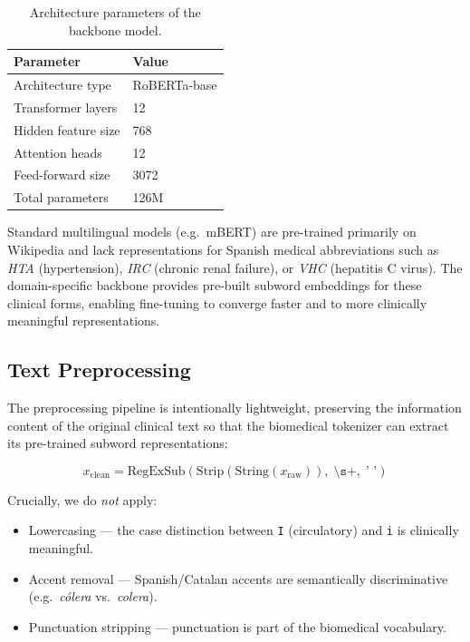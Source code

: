 \documentclass[10pt,a4paper,twocolumn]{article}
\begin{document}
\begin{table}[H]
\centering
\caption{Architecture parameters of the backbone model.}
\label{tab:backbone}
\begin{tabular}{ll}
\toprule
\textbf{Parameter} & \textbf{Value} \\
\midrule
Architecture type    & RoBERTa-base \\
Transformer layers   & 12 \\
Hidden feature size  & 768 \\
Attention heads      & 12 \\
Feed-forward size    & 3072 \\
Total parameters     & 126M \\
\bottomrule
\end{tabular}
\end{table}

Standard multilingual models (e.g.\ mBERT) are pre-trained primarily on Wikipedia
and lack representations for Spanish medical abbreviations such as \textit{HTA}
(hypertension), \textit{IRC} (chronic renal failure), or \textit{VHC} (hepatitis
C virus). The domain-specific backbone provides pre-built subword embeddings for
these clinical forms, enabling fine-tuning to converge faster and to more
clinically meaningful representations.

\subsection{Text Preprocessing}

The preprocessing pipeline is intentionally lightweight, preserving the
information content of the original clinical text so that the biomedical
tokenizer can extract its pre-trained subword representations:

\begin{equation}
  x_{\text{clean}} = \mathrm{RegExSub}\!\left(\mathrm{Strip}\!\left(\mathrm{String}(x_{\text{raw}})\right),\; \texttt{\textbackslash s+},\; \texttt{' '}\right)
\end{equation}

Crucially, we do \emph{not} apply:
\begin{itemize}
  \item Lowercasing --- the case distinction between \texttt{I} (circulatory) and
        \texttt{i} is clinically meaningful.
  \item Accent removal --- Spanish/Catalan accents are semantically discriminative
        (e.g.\ \textit{c\'{o}lera} vs.\ \textit{colera}).
  \item Punctuation stripping --- punctuation is part of the biomedical vocabulary.
\end{itemize}
\end{document}
